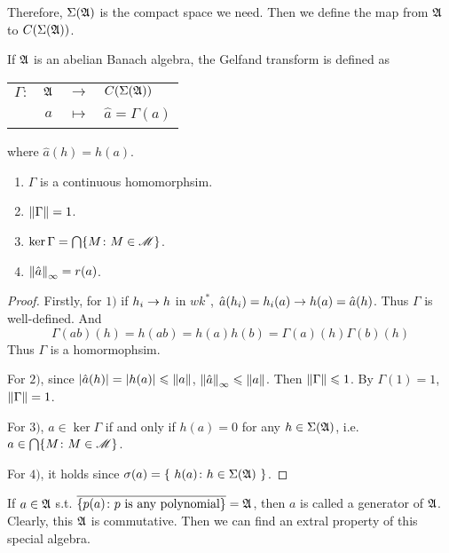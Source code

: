 \documentclass[a4paper,11pt]{report}
\begin{document}
Therefore, $\Sigma(\mathfrak{A})$ is the compact space we need. Then we define the map from $\mathfrak{A}$ to $C(\Sigma(\mathfrak{A}))$.

\begin{thm} \label{thm5}
	If $\mathfrak{A}$ is an abelian Banach algebra, the Gelfand transform is defined as
	\begin{center}
		\begin{tabular}{l c c l}
			$\Gamma \colon$ & $\mathfrak{A}$ & $\longrightarrow$ & $C(\Sigma(\mathfrak{A}))$ \\
			~ & $a$ & $\longmapsto$ & $\hat{a} = \Gamma(a)$
		\end{tabular}
	\end{center}
	where $\hat{a}(h)=h(a)$.
	\begin{enumerate}[label=\arabic*)]
		\item $\Gamma$ is a continuous homomorphsim.
		\item $\left\lVert\Gamma\right\lVert=1$.
		\item $\ker{\Gamma}=\bigcap\{M \colon M \in \mathscr{M}\}$.
		\item $\left\lVert\hat{a}\right\lVert_{\infty}=r(a)$.
	\end{enumerate}
\end{thm}
\begin{proof}
	Firstly, for $1)$ if $h_i \rightarrow h$ in $wk^{*}$, $\hat{a}(h_i) = h_i(a) \rightarrow h(a) = \hat{a}(h)$. Thus $\Gamma$ is well-defined. And
	\begin{equation*}
		\Gamma(ab)(h) = h(ab) = h(a)h(b) = \Gamma(a)(h)\Gamma(b)(h)
	\end{equation*}
	Thus $\Gamma$ is a homormophsim.
	\item For $2)$, since $\left\lvert\hat{a}(h)\right\lvert = \left\lvert h(a)\right\lvert \leqslant \left\lVert a\right\lVert$, $\left\lVert\hat{a}\right\lVert_{\infty} \leqslant \left\lVert a\right\lVert$. Then $\left\lVert\Gamma\right\lVert \leqslant 1$. By $\Gamma(1) = 1$, $\left\lVert\Gamma\right\lVert = 1$.
	\item For $3)$, $a \in \ker{\Gamma}$ if and only if $h(a) = 0$ for any $h \in \Sigma(\mathfrak{A})$, i.e. $a \in \bigcap\{M \colon M \in \mathscr{M}\}$. 
	\item For $4)$, it holds since $\sigma(a) = \{~ h(a) \colon h \in \Sigma(\mathfrak{A}) ~\}$.
\end{proof}

If $a \in \mathfrak{A}$ s.t. $\overline{\{p(a) \colon p \text{ is any polynomial}\}} = \mathfrak{A}$, then $a$ is called a generator of $\mathfrak{A}$. Clearly, this $\mathfrak{A}$ is commutative. Then we can find an extral property of this special algebra.
\end{document}
